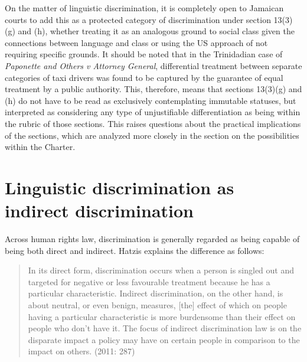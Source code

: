 \documentclass[output=paper,colorlinks,citecolor=brown]{langscibook}
\begin{document}
On the matter of linguistic discrimination, it is completely open to Jamaican courts to add this as a protected category of discrimination under section 13(3)(g) and (h), whether treating it as an analogous ground to social class given the connections between language and class or using the US approach of not requiring specific grounds. It should be noted that in the Trinidadian case of \textit{Paponette and Others v Attorney General}, differential treatment between separate categories of taxi drivers was found to be captured by the guarantee of equal treatment by a public authority. This, therefore, means that sections 13(3)(g) and (h) do not have to be read as exclusively contemplating immutable statuses, but interpreted as considering any type of unjustifiable differentiation as being within the rubric of those sections. This raises questions about the practical implications of the sections, which are analyzed more closely in the section on the possibilities within the Charter. 


\section{Linguistic discrimination as indirect discrimination}

Across human rights law, discrimination is generally regarded as being capable of being both direct and indirect. Hatzis explains the difference as follows:

\begin{quote}
    In its direct form, discrimination occurs when a person is singled out and targeted for negative or less favourable treatment because he has a particular characteristic. Indirect discrimination, on the other hand, is about neutral, or even benign, measures, [the] effect of which on people having a particular characteristic is more burdensome than their effect on people who don't have it. The focus of indirect discrimination law is on the disparate impact a policy may have on certain people in comparison to the impact on others. (2011: 287)
\end{quote}
\end{document}
